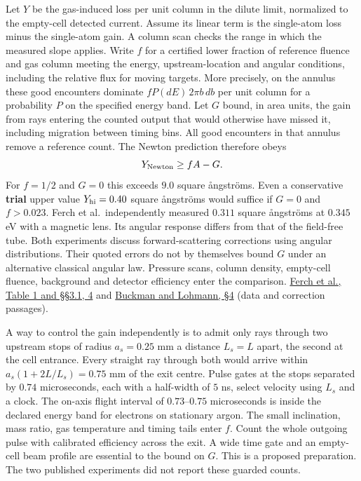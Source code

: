 \documentclass[11pt,a4paper]{article}
\begin{document}
Let \(Y\) be the gas-induced loss per unit column in the dilute limit,
normalized to the empty-cell detected current. Assume its linear term is
the single-atom loss minus the single-atom gain. A column scan checks
the range in which the measured slope applies. Write \(f\) for a
certified lower fraction of reference fluence and gas column meeting the
energy, upstream-location and angular conditions, including the relative
flux for moving targets. More precisely, on the annulus these good
encounters dominate \(fP(dE)\,2\pi b\,db\) per unit column for a
probability \(P\) on the specified energy band. Let \(G\) bound, in area
units, the gain from rays entering the counted output that would
otherwise have missed it, including migration between timing bins. All
good encounters in that annulus remove a reference count. The Newton
prediction therefore obeys \[
 Y_{\rm Newton}\ge f A-G .
\] For \(f=1/2\) and \(G=0\) this exceeds \(9.0\) square ångströms. Even
a conservative \textbf{trial} upper value \(Y_{\rm hi}=0.40\) square
ångströms would suffice if \(G=0\) and \(f>0.023\). Ferch et
al.~independently measured \(0.311\) square ångströms at \(0.345\) eV
with a magnetic lens. Its angular response differs from that of the
field-free tube. Both experiments discuss forward-scattering corrections
using angular distributions. Their quoted errors do not by themselves
bound \(G\) under an alternative classical angular law. Pressure scans,
column density, empty-cell fluence, background and detector efficiency
enter the comparison.
\href{https://doi.org/10.1088/0022-3700/18/5/017}{Ferch et al., Table 1
and §§3.1, 4} and
\href{https://doi.org/10.1088/0022-3700/19/16/013}{Buckman and Lohmann,
§4} (data and correction passages).

A way to control the gain independently is to admit only rays through
two upstream stops of radius \(a_s=0.25\) mm a distance \(L_s=L\) apart,
the second at the cell entrance. Every straight ray through both would
arrive within \(a_s(1+2L/L_s)=0.75\) mm of the exit centre. Pulse gates
at the stops separated by \(0.74\) microseconds, each with a half-width
of \(5\) ns, select velocity using \(L_s\) and a clock. The on-axis
flight interval of \(0.73\)--\(0.75\) microseconds is inside the
declared energy band for electrons on stationary argon. The small
inclination, mass ratio, gas temperature and timing tails enter \(f\).
Count the whole outgoing pulse with calibrated efficiency across the
exit. A wide time gate and an empty-cell beam profile are essential to
the bound on \(G\). This is a proposed preparation. The two published
experiments did not report these guarded counts.
\end{document}
